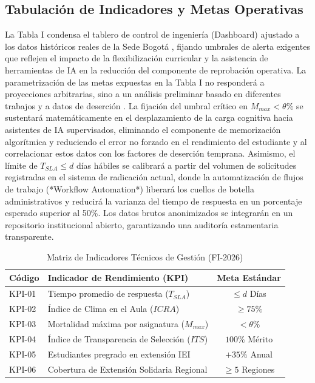 \documentclass[journal,10pt,twocolumn,letterpaper]{IEEEtran}
\begin{document}
\subsection{Tabulación de Indicadores y Metas Operativas}
La Tabla I condensa el tablero de control de ingeniería (Dashboard) ajustado a los datos históricos reales de la Sede Bogotá \cite{planeacion_unal_cifras}, fijando umbrales de alerta exigentes que reflejen el impacto de la flexibilización curricular y la asistencia de herramientas de IA en la reducción del componente de reprobación operativa. La parametrización de las metas expuestas en la Tabla I no responderá a proyecciones arbitrarias, sino a un análisis preliminar basado en diferentes trabajos \cite{mathsapproval2} y a datos de deserción \cite{planeacion_unal_cifras}. La fijación del umbral crítico en $M_{max} < \theta\%$ se sustentará matemáticamente en el desplazamiento de la carga cognitiva hacia asistentes de IA supervisados, eliminando el componente de memorización algorítmica y reduciendo el error no forzado en el rendimiento del estudiante y al correlacionar estos datos con los factores de deserción temprana. Asimismo, el límite de $T_{SLA} \le d$ días hábiles se calibrará a partir del volumen de solicitudes registradas en el sistema de radicación actual, donde la automatización de flujos de trabajo (*Workflow Automation*) liberará los cuellos de botella administrativos y reducirá la varianza del tiempo de respuesta en un porcentaje esperado superior al 50\%. Los datos brutos anonimizados se integrarán en un repositorio institucional abierto, garantizando una auditoría estamentaria transparente.


\begin{table}[htbp]
\caption{Matriz de Indicadores Técnicos de Gestión (FI-2026)}
\begin{center}
\begin{tabular}{llc}
\toprule
\textbf{Código} & \textbf{Indicador de Rendimiento (KPI)} & \textbf{Meta Estándar} \\
\midrule
KPI-01 & Tiempo promedio de respuesta ($T_{SLA}$) & $\le d$ Días \\
KPI-02 & Índice de Clima en el Aula ($ICRA$) & $\ge 75\%$ \\
KPI-03 & Mortalidad máxima por asignatura ($M_{max}$) & $< \theta\%$ \\
KPI-04 & Índice de Transparencia de Selección ($ITS$) & $100\%$ Mérito \\
KPI-05 & Estudiantes pregrado en extensión IEI & $+35\%$ Anual \\
KPI-06 & Cobertura de Extensión Solidaria Regional & $\ge 5$ Regiones \\
\bottomrule
\end{tabular}
\end{center}
\label{tab:metrics}
\end{table}
\end{document}
